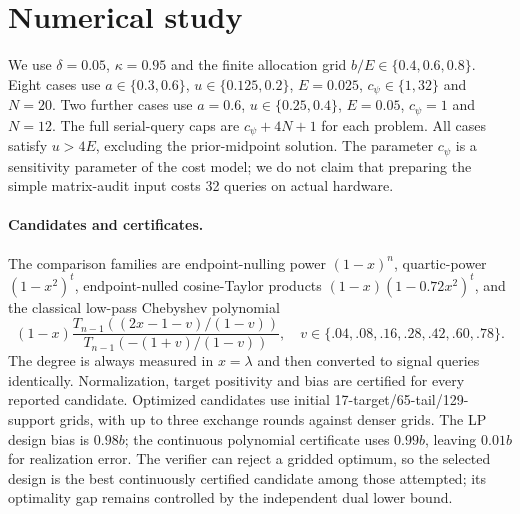 \section{Numerical study}\label{sec:results}
We use $\delta=0.05$, $\kappa=0.95$ and the finite allocation grid
$b/E\in\{0.4,0.6,0.8\}$. Eight cases use
$a\in\{0.3,0.6\}$, $u\in\{0.125,0.2\}$, $E=0.025$,
$c_\psi\in\{1,32\}$ and $N=20$. Two further cases use
$a=0.6$, $u\in\{0.25,0.4\}$, $E=0.05$, $c_\psi=1$ and $N=12$.
The full serial-query caps are $c_\psi+4N+1$ for each problem.
All cases satisfy $u>4E$, excluding the prior-midpoint solution.
The parameter $c_\psi$ is a sensitivity parameter of the cost model;
we do not claim that preparing the simple matrix-audit input costs 32
queries on actual hardware.

\paragraph{Candidates and certificates.}
The comparison families are endpoint-nulling power $(1-x)^n$,
quartic-power $(1-x^2)^t$, endpoint-nulled cosine-Taylor products
$(1-x)(1-0.72x^2)^t$, and the classical low-pass Chebyshev polynomial
\[
 (1-x)\frac{T_{n-1}((2x-1-v)/(1-v))}
                  {T_{n-1}(-(1+v)/(1-v))},
 \quad v\in\{.04,.08,.16,.28,.42,.60,.78\}.
\]
The degree is always measured in $x=\lambda$ and then converted to signal
queries identically. Normalization, target positivity and bias are
certified for every reported candidate. Optimized candidates use initial
17-target/65-tail/129-support grids, with up to three exchange rounds
against denser grids. The LP design bias is $0.98b$; the continuous
polynomial certificate uses $0.99b$, leaving $0.01b$ for realization error.
The verifier can reject a gridded optimum, so the selected design is the
best continuously certified candidate among those attempted; its
optimality gap remains controlled by the independent dual lower bound.

\begin{table}[tb]
\centering\small

\caption{Prior-only selections. $n$ is Gram-polynomial degree. ``LP'' is a
certified optimized polynomial; ``Cheb.'' is a certified member of the
tested Chebyshev grid. The gap is $100(J^{\rm up}/\min J^{\rm lo}-1)$,
relative to the endpoint-nulling class, degree cap and finite allocation
grid, not to all quantum estimators.}
\label{tab:selection}
\end{table}

